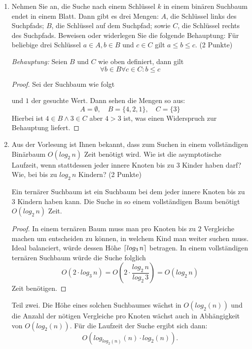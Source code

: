\documentclass[ngerman,landscape,twocolumn]{adtexsheet}
\DeclarePairedDelimiter\ceil{\lceil}{\rceil}
\begin{document}
\begin{question}
    \begin{enumerate}
        \item Nehmen Sie an, die Suche nach einem Schlüssel $k$ in einem binären Suchbaum endet in einem Blatt. Dann gibt es drei Mengen: $A$, die Schlüssel links des Suchpfads; $B$, die Schlüssel auf dem Suchpfad; sowie $C$, die Schlüssel rechts des Suchpfads. Beweisen oder widerlegen Sie die folgende Behauptung: Für beliebige drei Schlüssel $a \in A, b \in B$ und $c \in C$ gilt $a \leq b \leq c$. (2 Punkte)
        
        \emph{Behauptung:} Seien $B$ und $C$ wie oben definiert, dann gilt $$\forall b \in B \forall c \in C: b \leq c$$
        \begin{proof} Sei der Suchbaum wie folgt
        \begin{center}
        \end{center}
        und $1$ der gesuchte Wert. Dann sehen die Mengen so aus: 
\[
A=\emptyset, \quad B=\{4,2,1\}, \quad C=\{3\}
\]
        Hierbei ist $4 \in B \land 3 \in C$ aber $4 > 3$ ist, was einen Widerspruch zur Behauptung liefert.
        \end{proof}
        
        \newpage
        \item Aus der Vorlesung ist Ihnen bekannt, dass zum Suchen in einem vollständigen Binärbaum $O(log_2\,n)$ Zeit benötigt wird. Wie ist die asymptotische Laufzeit, wenn stattdessen jeder innere Knoten bis zu $3$ Kinder haben darf? Wie, bei bis zu $log_2\,n$ Kindern? (2 Punkte)
        
        \begin{behauptung}
        Ein ternärer Suchbaum ist ein Suchbaum bei dem jeder innere Knoten bis zu $3$ Kindern haben kann. Die Suche in so einem vollständigen Baum benötigt $O(log_2\, n)$ Zeit.
        \end{behauptung}
        \begin{proof}
        In einem ternären Baum muss man pro Knoten bis zu $2$ Vergleiche machen um entscheiden zu können, in welchem Kind man weiter suchen muss. Ideal balanciert, würde dessen Höhe $\ceil*{log_3\,n}$ betragen. In einem vollständigen ternären Suchbaum würde die Suche folglich
\[
O(2 \cdot log_3\,n) = O\left(2 \cdot \frac{log_2\, n}{log_2\, 3}\right) = O(log_2\, n)
\]
        Zeit benötigen.
        \end{proof}
        
        Teil zwei. Die Höhe eines solchen Suchbaumes wächst in $O(log_2(n))$ und die Anzahl der nötigen Vergleiche pro Knoten wächst auch in Abhängigkeit von $O(log_2(n))$. Für die Laufzeit der Suche ergibt sich dann:
\[
O\left(log_{log_2(n)}(n) \cdot log_2(n)\right)
.\]
    \end{enumerate}
\end{question}
\end{document}
